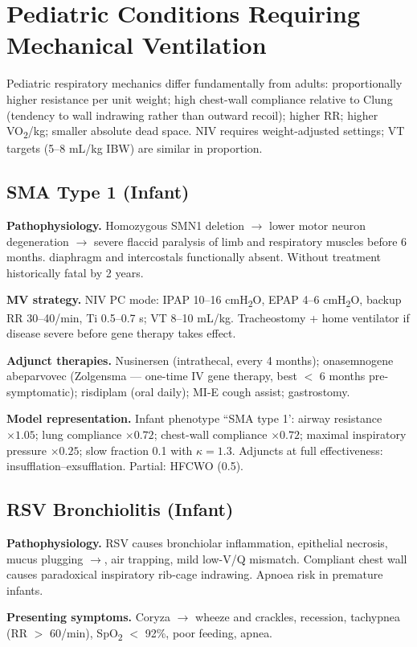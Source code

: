\section{Pediatric Conditions Requiring Mechanical Ventilation}
Pediatric respiratory mechanics differ fundamentally from adults: proportionally higher resistance per unit weight; high chest-wall compliance relative to Clung (tendency to wall indrawing rather than outward recoil); higher RR; higher VO\textsubscript{2}/kg; smaller absolute dead space. NIV requires weight-adjusted settings; VT targets (5--8 mL/kg IBW) are similar in proportion.

\subsection{SMA Type 1 (Infant)}
\textbf{Pathophysiology.} Homozygous SMN1 deletion $\to$ lower motor neuron degeneration $\to$ severe flaccid paralysis of limb and respiratory muscles before 6 months. diaphragm and intercostals functionally absent. Without treatment historically fatal by 2 years.

\textbf{MV strategy.} NIV PC mode: IPAP 10--16 cmH\textsubscript{2}O, EPAP 4--6 cmH\textsubscript{2}O, backup RR 30--40/min, Ti 0.5--0.7 s; VT 8--10 mL/kg. Tracheostomy + home ventilator if disease severe before gene therapy takes effect.

\textbf{Adjunct therapies.} Nusinersen (intrathecal, every 4 months); onasemnogene abeparvovec (Zolgensma --- one-time IV gene therapy, best $<$ 6 months pre-symptomatic); risdiplam (oral daily); MI-E cough assist; gastrostomy.

\textbf{Model representation.} Infant phenotype ``SMA type 1': airway resistance $\times1.05$; lung compliance $\times0.72$; chest-wall compliance $\times0.72$; maximal inspiratory pressure $\times0.25$; slow fraction 0.1 with $\kappa=1.3$. Adjuncts at full effectiveness: insufflation--exsufflation. Partial: HFCWO (0.5).

\subsection{RSV Bronchiolitis (Infant)}
\textbf{Pathophysiology.} RSV causes bronchiolar inflammation, epithelial necrosis, mucus plugging $\to$, air trapping, mild low-V/Q mismatch. Compliant chest wall causes paradoxical inspiratory rib-cage indrawing. Apnoea risk in premature infants.

\textbf{Presenting symptoms.} Coryza $\to$ wheeze and crackles, recession, tachypnea (RR $>$ 60/min), SpO\textsubscript{2} $<$ 92\%, poor feeding, apnea.

